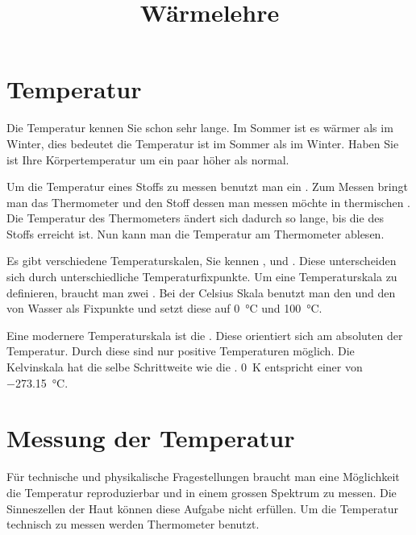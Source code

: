 \documentclass[12pt,a4paper,twoside]{article}
\title{Wärmelehre}
\date{}
\begin{document}
\maketitle




\section*{Temperatur}

\StartLueckentext

Die Temperatur kennen Sie schon sehr lange.
Im Sommer ist es wärmer als im Winter, dies bedeutet die Temperatur ist im Sommer  als im Winter.
Haben Sie  ist Ihre Körpertemperatur um ein paar  höher als normal.

Um die Temperatur eines Stoffs zu messen benutzt man ein .
Zum Messen bringt man das Thermometer und den Stoff dessen  man messen möchte in thermischen .
Die Temperatur des Thermometers ändert sich dadurch so lange, bis die  des Stoffs erreicht ist.
Nun kann man die Temperatur am Thermometer ablesen.

Es gibt verschiedene Temperaturskalen, Sie kennen ,  und .
Diese  unterscheiden sich durch unterschiedliche Temperaturfixpunkte.
Um eine Temperaturskala zu definieren, braucht man zwei . 
Bei der Celsius Skala benutzt man den  und den  von Wasser als Fixpunkte und setzt diese auf \SI{0}{\celsius} und \SI{100}{\celsius}.

Eine modernere Temperaturskala ist die . 
Diese orientiert sich am absoluten  der Temperatur.
Durch diese  sind nur positive Temperaturen möglich.
Die Kelvinskala hat die selbe Schrittweite wie die .
\SI{0}{K} entspricht einer  von \SI{-273.15}{\celsius}.

\StoppLueckentext

\newpage


\section*{Messung der Temperatur}
Für technische und physikalische Fragestellungen braucht man eine Möglichkeit die Temperatur
reproduzierbar und in einem grossen Spektrum zu messen. Die Sinneszellen der Haut können diese Aufgabe nicht erfüllen.
Um die Temperatur technisch zu messen werden Thermometer benutzt.
\end{document}
